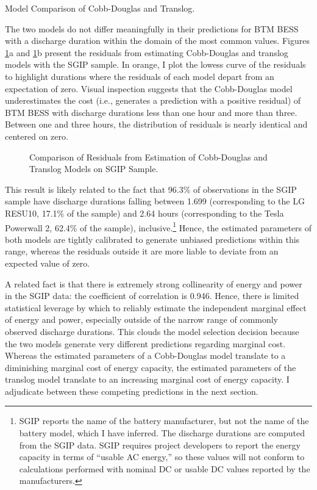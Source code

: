 \begin{table}[h]

\caption{Model Comparison of Cobb-Douglas and Translog.}\label{tab:CD_vs_TL}
\end{table}

The two models do not differ meaningfully in their predictions for BTM BESS with a discharge duration within the domain of the most common values. Figures \ref{fig:CD_vs_TL_resids}a and \ref{fig:CD_vs_TL_resids}b present the residuals from estimating Cobb-Douglas and translog models with the SGIP sample. In orange, I plot the lowess curve \citep{cleveland1979} of the residuals to highlight durations where the residuals of each model depart from an expectation of zero. Visual inspection suggests that the Cobb-Douglas model underestimates the cost (i.e., generates a prediction with a positive residual) of BTM BESS with discharge durations less than one hour and more than three. Between one and three hours, the distribution of residuals is nearly identical and centered on zero.

\begin{figure}[h]
\centering
\caption{Comparison of Residuals from Estimation of Cobb-Douglas and Translog Models on SGIP Sample.}\label{fig:CD_vs_TL_resids}
\end{figure}

This result is likely related to the fact that 96.3\% of observations in the SGIP sample have discharge durations falling between 1.699 (corresponding to the LG RESU10, 17.1\% of the sample) and 2.64 hours (corresponding to the Tesla Powerwall 2, 62.4\% of the sample), inclusive.\footnote{SGIP reports the name of the battery manufacturer, but not the name of the battery model, which I have inferred. The discharge durations are computed from the SGIP data. SGIP requires project developers to report the energy capacity in terms of ``usable AC energy,'' so these values will not conform to calculations performed with nominal DC or usable DC values reported by the manufacturers.} Hence, the estimated parameters of both models are tightly calibrated to generate unbiased predictions within this range, whereas the residuals outside it are more liable to deviate from an expected value of zero.

A related fact is that there is extremely strong collinearity of energy and power in the SGIP data: the coefficient of correlation is 0.946. Hence, there is limited statistical leverage by which to reliably estimate the independent marginal effect of energy and power, especially outside of the narrow range of commonly observed discharge durations. This clouds the model selection decision because the two models generate very different predictions regarding marginal cost. Whereas the estimated parameters of a Cobb-Douglas model translate to a diminishing marginal cost of energy capacity, the estimated parameters of the translog model translate to an increasing marginal cost of energy capacity. I adjudicate between these competing predictions in the next section.

